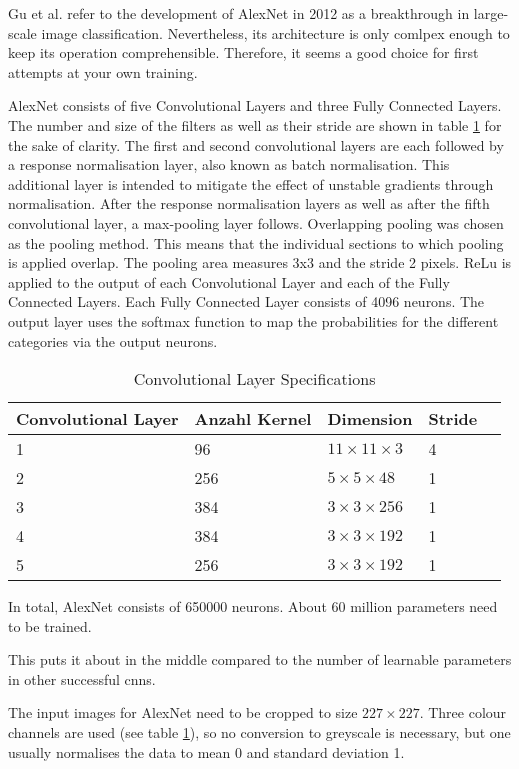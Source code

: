 Gu et al. \cite{Gu:2018} refer to the development of AlexNet in 2012 as a breakthrough in large-scale image classification. Nevertheless, its architecture is only comlpex enough to keep its operation comprehensible. Therefore, it seems a good choice for first attempts at your own training.


AlexNet consists of five Convolutional Layers and three Fully Connected Layers. The number and size of the filters as well as their stride are shown in table \ref{ConvAlex} for the sake of clarity. The first and second convolutional layers are each followed by a response normalisation layer, also known as batch normalisation. This additional layer is intended to mitigate the effect of unstable gradients through normalisation. After the response normalisation layers as well as after the fifth convolutional layer, a max-pooling layer follows. Overlapping pooling was chosen as the pooling method. This means that the individual sections to which pooling is applied overlap. The pooling area measures 3x3 and the stride 2 pixels. ReLu is applied to the output of each Convolutional Layer and each of the Fully Connected Layers. Each Fully Connected Layer consists of 4096 neurons. The output layer uses the softmax function to map the probabilities for the different categories via the output neurons. \cite{Krizhevsky:2012,Alake:2020}



\begin{table} [H]
\centering
	\begin{tabular} {l l l l l}
Convolutional Layer & Anzahl Kernel & Dimension & Stride \\ \hline
1 & 96 & $11\times11\times3$ & 4\\
2 & 256 & $5\times5\times48$ & 1\\
3 & 384 & $3\times3\times256$ & 1\\
4 & 384 & $3\times3\times192$ & 1\\
5 & 256 & $3\times3\times192$ & 1\\
\end{tabular}
\caption{Convolutional Layer Specifications}
\label{ConvAlex}
\end{table}

In total, AlexNet consists of 650000 neurons. About 60 million parameters need to be trained. \cite{Krizhevsky:2012}

This puts it about in the middle compared to the number of learnable parameters in other successful \ac{cnn}s.


The input images for AlexNet need to be cropped to size $227 \times 227$. Three colour channels are used (see table \ref{ConvAlex}), so no conversion to greyscale is necessary, but one usually normalises the data to mean 0 and standard deviation 1.\cite{Alake:2020}

